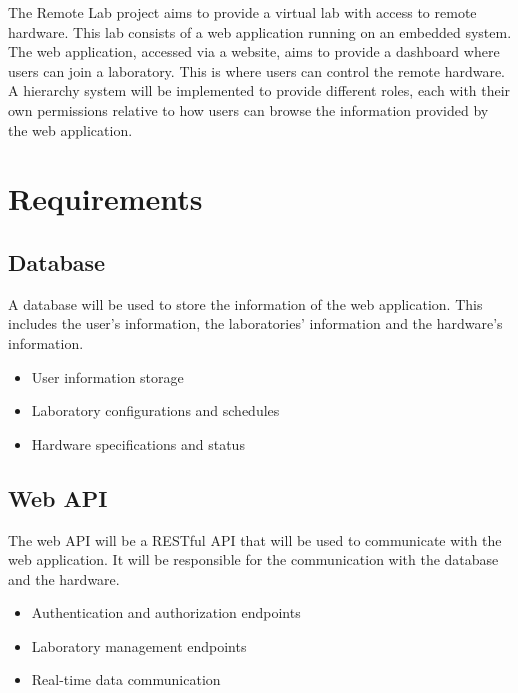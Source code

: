 \documentclass[a4paper,twoside,11pt]{article}
\begin{document}
The Remote Lab project aims to provide a virtual lab with access to remote hardware. This lab consists of a web application running on an embedded system.
The web application, accessed via a website, aims to provide a dashboard where users can join a laboratory. This is where users can control the remote hardware.
A hierarchy system will be implemented to provide different roles, each with their own permissions relative to how users can browse the information provided by the web application.

\section*{Requirements}
\subsection*{Database}
A database will be used to store the information of the web application.
This includes the user's information, the laboratories' information and the hardware's information.
\begin{itemize}
    \item User information storage
    \item Laboratory configurations and schedules
    \item Hardware specifications and status
\end{itemize}

\subsection*{Web API}
The web API will be a RESTful API that will be used to communicate with the web application.
It will be responsible for the communication with the database and the hardware.
\begin{itemize}
    \item Authentication and authorization endpoints
    \item Laboratory management endpoints
    \item Real-time data communication
\end{itemize}
\end{document}

